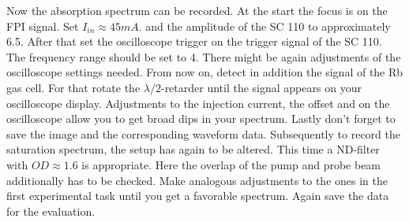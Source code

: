 Now the absorption spectrum can be recorded. At the start the focus is on the FPI signal. Set $I_{in} \approx 45mA$. and the amplitude of the SC 110 to approximately 6.5. After that set the oscilloscope trigger on the trigger signal of the SC 110. The frequency range should be set to 4. There might be again adjustments of the oscilloscope settings needed. From now on, detect in addition the signal of the Rb gas cell. For that rotate the $\lambda/2$-retarder until the signal appears on your oscilloscope display. Adjustments to the injection current, the offset and on the oscilloscope allow you to get broad dips in your spectrum. Lastly don't forget to save the image and the corresponding waveform data. Subsequently to record the saturation spectrum, the setup has again to be altered. This time a ND-filter with $OD\approx1.6$ is appropriate. Here the overlap of the pump and probe beam additionally has to be checked. Make analogous adjustments to the ones in the first experimental task until you get a favorable spectrum. Again save the data for the evaluation. 
